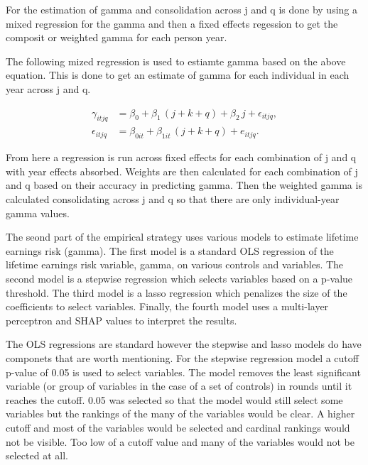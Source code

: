 \documentclass[12pt]{article}
\begin{document}
\begin{onehalfspace}
For the estimation of gamma and consolidation across j and q is done by using a mixed regression for the gamma and then a fixed effects regession to get the composit or weighted gamma for each person year.

The following mized regression is used to estiamte gamma based on the above equation. This is done to get an estimate of gamma for each individual in each year across j and q. 



\begin{align}
\gamma_{itjq}
&= \beta_{0}
  + \beta_{1}\,(j + k + q)
  + \beta_{2}\,j
  + \epsilon_{itjq}, \\[1ex]
\epsilon_{itjq}
&= \beta_{0it}
  + \beta_{1it}\,(j + k + q)
  + e_{itjq}.
\end{align}




From here a regression is run across fixed effects for each combination of j and q with year effects absorbed. Weights are then calculated for each combination of j and q based on their accuracy in predicting gamma. Then the weighted gamma is calculated consolidating across j and q so that there are only individual-year gamma values.





The seond part of the empirical strategy uses various models to estimate lifetime earnings risk (gamma). The first model is a standard OLS regression of the lifetime earnings risk variable, gamma, on various controls and variables. The second model is a stepwise regression which selects variables based on a p-value threshold. The third model is a lasso regression which penalizes the size of the coefficients to select variables. Finally, the fourth model uses a multi-layer perceptron and SHAP values to interpret the results.

The OLS regressions are standard however the stepwise and lasso models do have componets that are worth mentioning. For the stepwise regression model a cutoff p-value of 0.05 is used to select variables. The model removes the least significant variable (or group of variables in the case of a set of controls) in rounds until it reaches the cutoff. 0.05 was selected so that the model would still select some variables but the rankings of the many of the variables would be clear. A higher cutoff and most of the variables would be selected and cardinal rankings would not be visible. Too low of a cutoff value and many of the variables would not be selected at all. 


\end{onehalfspace}
\end{document}
